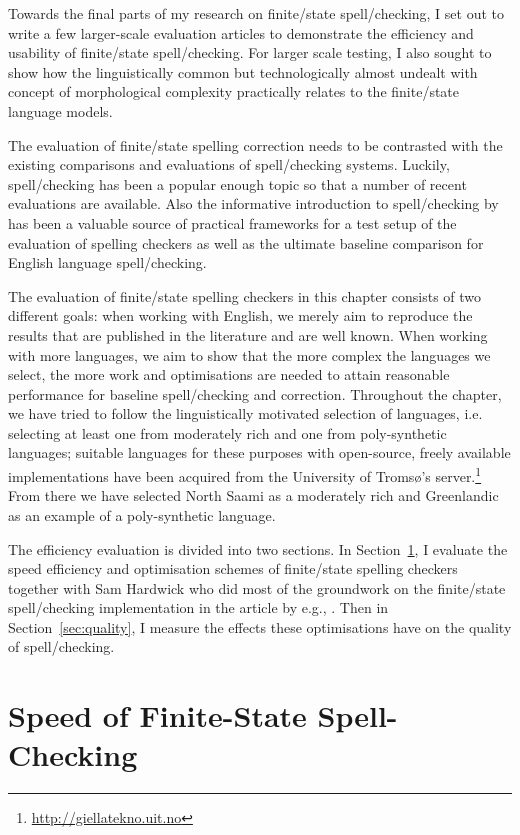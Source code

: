 \documentclass[officiallayout,final]{unihelcompling}
\begin{document}
Towards the final parts of my research on finite\-/state spell\-/checking, I
set out to write a few larger-scale evaluation articles to demonstrate the
efficiency and usability of finite\-/state spell\-/checking. For larger scale
testing, I also sought to show how the linguistically common but
technologically almost undealt with concept of \gls{morphological complexity}
practically relates to the finite\-/state language models.

The evaluation of finite\-/state spelling correction needs to be contrasted
with the existing comparisons and evaluations of spell\-/checking systems.
Luckily, spell\-/checking has been a popular enough topic so that a number of
recent evaluations are available.  Also the informative introduction to
spell\-/checking by~\citet{norvig2010howto} has been a valuable source of
practical frameworks for a test setup of the evaluation of spelling checkers as
well as the ultimate baseline comparison for English language spell\-/checking.

The evaluation of finite\-/state spelling checkers in this chapter consists of
two different goals: when working with English, we merely aim to reproduce the
results that are published in the literature and are well known. When working
with more 
languages, we aim to show that the more complex the languages we select, the
more work and optimisations are needed to attain reasonable performance for
baseline spell\-/checking and correction.  Throughout the chapter, we have
tried to follow the linguistically motivated selection of languages, i.e.
selecting at least one from moderately rich and one from poly-synthetic
languages; suitable languages for these purposes with open-source, freely
available implementations have been acquired from the University of Tromsø's
server.\footnote{\url{http://giellatekno.uit.no}} From there we have selected
North Saami as a moderately rich and Greenlandic as an example of a
poly-synthetic language.

The efficiency evaluation is divided into two sections. In
Section~\ref{sec:speed}, I evaluate the speed efficiency and optimisation
schemes of finite\-/state spelling checkers together with Sam Hardwick who did
most of the groundwork on the finite\-/state spell\-/checking implementation in
the article by e.g.,  \citet{linden2011hfst}. Then in
Section~\ref{sec:quality}, I measure the effects these optimisations have on
the quality of spell\-/checking.

\section{Speed of Finite-State Spell-Checking}
\label{sec:speed}
\end{document}
